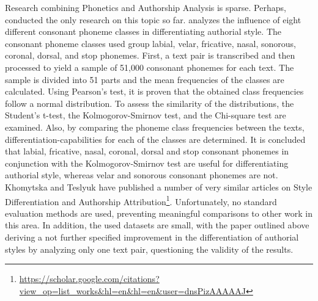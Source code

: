 Research combining Phonetics and Authorship Analysis is sparse.
Perhaps, \citeauthor{khomytska2019nonparametric} conducted the only research on this topic so far.
\cite{khomytska2019nonparametric} analyzes the influence of eight different consonant phoneme classes in differentiating authorial style.
The consonant phoneme classes used group labial, velar, fricative, nasal, sonorous, coronal, dorsal, and stop phonemes.
First, a text pair is transcribed and then processed to yield a sample of 51,000 consonant phonemes for each text.
The sample is divided into 51 parts and the mean frequencies of the classes are calculated.
Using Pearson's test, it is proven that the obtained class frequencies follow a normal distribution.
To assess the similarity of the distributions, the Student's t-test, the Kolmogorov-Smirnov test, and the Chi-square test are examined.
Also, by comparing the phoneme class frequencies between the texts, differentiation-capabilities for each of the classes are determined.
It is concluded that labial, fricative, nasal, coronal, dorsal and  stop consonant phonemes in conjunction with the Kolmogorov-Smirnov test are useful for differentiating authorial style, whereas velar and sonorous consonant phonemes are not.
Khomytska and Teslyuk have published a number of very similar articles on Style Differentiation and Authorship Attribution\footnote{\url{https://scholar.google.com/citations?view_op=list_works&hl=en&hl=en&user=dnsPizAAAAAJ}}.
Unfortunately, no standard evaluation methods are used, preventing meaningful comparisons to other work in this area.
In addition, the used datasets are small, with the paper outlined above deriving a not further specified improvement in the differentiation of authorial styles by analyzing only one text pair, questioning the validity of the results.

